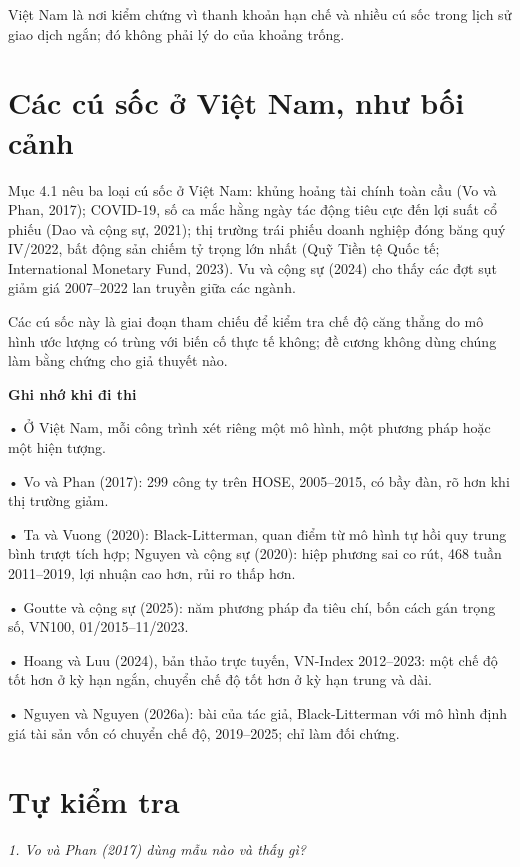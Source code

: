 Việt Nam là nơi kiểm chứng vì thanh khoản hạn chế và nhiều cú sốc trong lịch sử giao dịch ngắn; đó không phải lý do của khoảng trống.

\section{Các cú sốc ở Việt Nam, như bối cảnh}

Mục 4.1 nêu ba loại cú sốc ở Việt Nam: khủng hoảng tài chính toàn cầu (Vo và Phan, 2017); COVID-19, số ca mắc hằng ngày tác động tiêu cực đến lợi suất cổ phiếu (Dao và cộng sự, 2021); thị trường trái phiếu doanh nghiệp đóng băng quý IV/2022, bất động sản chiếm tỷ trọng lớn nhất (Quỹ Tiền tệ Quốc tế; International Monetary Fund, 2023). Vu và cộng sự (2024) cho thấy các đợt sụt giảm giá 2007--2022 lan truyền giữa các ngành.

Các cú sốc này là giai đoạn tham chiếu để kiểm tra chế độ căng thẳng do mô hình ước lượng có trùng với biến cố thực tế không; đề cương không dùng chúng làm bằng chứng cho giả thuyết nào.

\begin{tcolorbox}[breakable]
\textbf{Ghi nhớ khi đi thi}

• Ở Việt Nam, mỗi công trình xét riêng một mô hình, một phương pháp hoặc một hiện tượng.

• Vo và Phan (2017): 299 công ty trên HOSE, 2005--2015, có bầy đàn, rõ hơn khi thị trường giảm.

• Ta và Vuong (2020): Black-Litterman, quan điểm từ mô hình tự hồi quy trung bình trượt tích hợp; Nguyen và cộng sự (2020): hiệp phương sai co rút, 468 tuần 2011--2019, lợi nhuận cao hơn, rủi ro thấp hơn.

• Goutte và cộng sự (2025): năm phương pháp đa tiêu chí, bốn cách gán trọng số, VN100, 01/2015--11/2023.

• Hoang và Luu (2024), bản thảo trực tuyến, VN-Index 2012--2023: một chế độ tốt hơn ở kỳ hạn ngắn, chuyển chế độ tốt hơn ở kỳ hạn trung và dài.

• Nguyen và Nguyen (2026a): bài của tác giả, Black-Litterman với mô hình định giá tài sản vốn có chuyển chế độ, 2019--2025; chỉ làm đối chứng.
\end{tcolorbox}

\section{Tự kiểm tra}

{\itshape 1. Vo và Phan (2017) dùng mẫu nào và thấy gì?\par}

